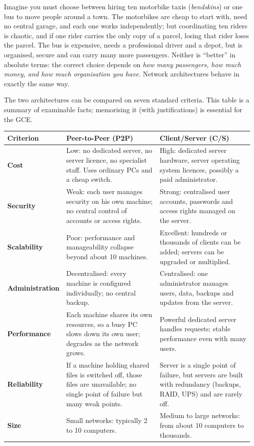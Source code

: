 \documentclass[11pt]{article}
\begin{document}
Imagine you must choose between hiring ten motorbike taxis (\emph{bendskins}) or one bus to move people around a town. The motorbikes are cheap to start with, need no central garage, and each one works independently; but coordinating ten riders is chaotic, and if one rider carries the only copy of a parcel, losing that rider loses the parcel. The bus is expensive, needs a professional driver and a depot, but is organised, secure and can carry many more passengers. Neither is ``better'' in absolute terms: the correct choice depends on \emph{how many passengers, how much money, and how much organisation you have}. Network architectures behave in exactly the same way.

\begin{propriete}
The two architectures can be compared on seven standard criteria. This table is a summary of examinable facts; memorising it (with justifications) is essential for the GCE.
\begin{center}
\begin{tabularx}{\linewidth}{|l|X|X|}
\hline
\rowcolor{popblueL} \textbf{Criterion} & \textbf{Peer-to-Peer (P2P)} & \textbf{Client/Server (C/S)} \\
\hline
\textbf{Cost} & Low: no dedicated server, no server licence, no specialist staff. Uses ordinary PCs and a cheap switch. & High: dedicated server hardware, server operating system licences, possibly a paid administrator. \\
\hline
\textbf{Security} & Weak: each user manages security on his own machine; no central control of accounts or access rights. & Strong: centralised user accounts, passwords and access rights managed on the server. \\
\hline
\textbf{Scalability} & Poor: performance and manageability collapse beyond about 10 machines. & Excellent: hundreds or thousands of clients can be added; servers can be upgraded or multiplied. \\
\hline
\textbf{Administration} & Decentralised: every machine is configured individually; no central backup. & Centralised: one administrator manages users, data, backups and updates from the server. \\
\hline
\textbf{Performance} & Each machine shares its own resources, so a busy PC slows down its own user; degrades as the network grows. & Powerful dedicated server handles requests; stable performance even with many users. \\
\hline
\textbf{Reliability} & If a machine holding shared files is switched off, those files are unavailable; no single point of failure but many weak points. & Server is a single point of failure, but servers are built with redundancy (backups, RAID, UPS) and are rarely off. \\
\hline
\textbf{Size} & Small networks: typically 2 to 10 computers. & Medium to large networks: from about 10 computers to thousands. \\
\hline
\end{tabularx}
\end{center}
\end{propriete}
\end{document}
